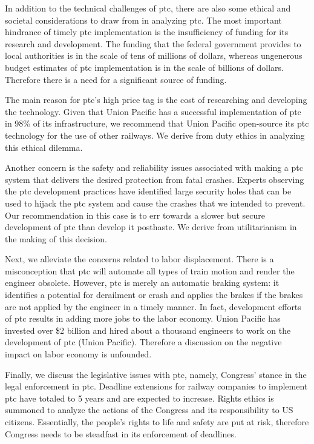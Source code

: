 \documentclass[11pt, titlepage]{article}
\begin{document}
In addition to the technical challenges of \gls{ptc}, there are also some
ethical and societal considerations to draw from in analyzing \gls{ptc}. The
most important hindrance of timely \gls{ptc} implementation is the
insufficiency of funding for its research and development. The funding that
the federal government provides to local authorities is in the scale of tens
of millions of dollars, whereas ungenerous budget estimates of \gls{ptc}
implementation is in the scale of billions of dollars. Therefore there is a
need for a significant source of funding.

The main reason for \gls{ptc}’s high price tag is the cost of researching and
developing the technology. Given that Union Pacific has a successful
implementation of \gls{ptc} in 98\% of its infrastructure, we recommend that
Union Pacific open-source its \gls{ptc} technology for the use of other
railways. We derive from duty ethics in analyzing this ethical dilemma.

Another concern is the safety and reliability issues associated with making a
\gls{ptc} system that delivers the desired protection from fatal crashes.
Experts observing the \gls{ptc} development practices have identified large
security holes that can be used to hijack the \gls{ptc} system and cause the
crashes that we intended to prevent. Our recommendation in this case is to err
towards a slower but secure development of \gls{ptc} than develop it
posthaste. We derive from utilitarianism in the making of this decision.

Next, we alleviate the concerns related to labor displacement. There is a
misconception that \gls{ptc} will automate all types of train motion and
render the engineer obsolete. However, \gls{ptc} is merely an automatic
braking system: it identifies a potential for derailment or crash and applies
the brakes if the brakes are not applied by the engineer in a timely manner.
In fact, development efforts of \gls{ptc} results in adding more jobs to the
labor economy. Union Pacific has invested over \$2 billion and hired about a
thousand engineers to work on the development of \gls{ptc} (Union Pacific).
Therefore a discussion on the negative impact on labor economy is unfounded.

Finally, we discuss the legislative issues with \gls{ptc}, namely, Congress’
stance in the legal enforcement in \gls{ptc}. Deadline extensions for railway
companies to implement \gls{ptc} have totaled to 5 years and are expected to
increase. Rights ethics is summoned to analyze the actions of the Congress and
its responsibility to US citizens. Essentially, the people’s rights to life
and safety are put at risk, therefore Congress needs to be steadfast in its
enforcement of deadlines.
\end{document}

